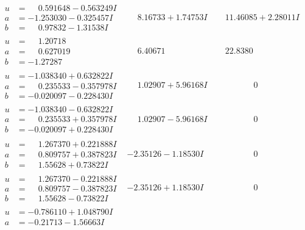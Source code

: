 \documentclass[1p]{elsarticle_modified}
\theoremstyle{definition}
\begin{document}
$$\begin{array}{c|c|c}
\begin{aligned}
u &= \phantom{-}0.591648 - 0.563249 I \\
a &= -1.253030 - 0.325457 I \\
b &= \phantom{-}0.97832 - 1.31538 I\end{aligned}
 & \phantom{-}8.16733 + 1.74753 I & \phantom{-}11.46085 + 2.28011 I \\ \hline\begin{aligned}
u &= \phantom{-}1.20718\phantom{ +0.000000I} \\
a &= \phantom{-}0.627019\phantom{ +0.000000I} \\
b &= -1.27287\phantom{ +0.000000I}\end{aligned}
 & \phantom{-}6.40671\phantom{ +0.000000I} & \phantom{-}22.8380\phantom{ +0.000000I} \\ \hline\begin{aligned}
u &= -1.038340 + 0.632822 I \\
a &= \phantom{-}0.235533 - 0.357978 I \\
b &= -0.020097 - 0.228430 I\end{aligned}
 & \phantom{-}1.02907 + 5.96168 I & \phantom{-0.000000 } 0 \\ \hline\begin{aligned}
u &= -1.038340 - 0.632822 I \\
a &= \phantom{-}0.235533 + 0.357978 I \\
b &= -0.020097 + 0.228430 I\end{aligned}
 & \phantom{-}1.02907 - 5.96168 I & \phantom{-0.000000 } 0 \\ \hline\begin{aligned}
u &= \phantom{-}1.267370 + 0.221888 I \\
a &= \phantom{-}0.809757 + 0.387823 I \\
b &= \phantom{-}1.55628 + 0.73822 I\end{aligned}
 & -2.35126 - 1.18530 I & \phantom{-0.000000 } 0 \\ \hline\begin{aligned}
u &= \phantom{-}1.267370 - 0.221888 I \\
a &= \phantom{-}0.809757 - 0.387823 I \\
b &= \phantom{-}1.55628 - 0.73822 I\end{aligned}
 & -2.35126 + 1.18530 I & \phantom{-0.000000 } 0 \\ \hline\begin{aligned}
u &= -0.786110 + 1.048790 I \\
a &= -0.21713 - 1.56663 I \\

\end{aligned}
\end{array}$$
\end{document}
